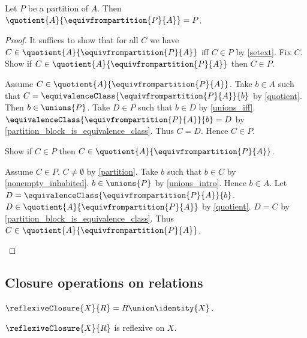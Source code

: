 \begin{proposition}\label{partition_eq_quotient_by_equivalence_from_partition}
    Let $P$ be a partition of $A$.
    Then $\quotient{A}{\equivfrompartition{P}{A}} = P$.
\end{proposition}
\begin{proof}
    It suffices to show that for all $C$ we have
        $C\in\quotient{A}{\equivfrompartition{P}{A}}$ iff $C\in P$
        by \cref{setext}.
    Fix $C$.
    Show if $C\in\quotient{A}{\equivfrompartition{P}{A}}$ then $C\in P$.
    \begin{subproof}
        Assume $C\in\quotient{A}{\equivfrompartition{P}{A}}$.
        Take $b\in A$ such that
            $C=\equivalenceClass{\equivfrompartition{P}{A}}{b}$
            by \cref{quotient}.
        Then $b\in\unions{P}$.
        Take $D\in P$ such that $b\in D$ by \cref{unions_iff}.
        $\equivalenceClass{\equivfrompartition{P}{A}}{b}=D$
            by \cref{partition_block_is_equivalence_class}.
        Thus $C=D$.
        Hence $C\in P$.
    \end{subproof}
    Show if $C\in P$ then
        $C\in\quotient{A}{\equivfrompartition{P}{A}}$.
    \begin{subproof}
        Assume $C\in P$.
        $C\neq\emptyset$ by \cref{partition}.
        Take $b$ such that $b\in C$ by \cref{nonempty_inhabited}.
        $b\in\unions{P}$ by \cref{unions_intro}.
        Hence $b\in A$.
        Let $D=\equivalenceClass{\equivfrompartition{P}{A}}{b}$.
        $D\in\quotient{A}{\equivfrompartition{P}{A}}$ by \cref{quotient}.
        $D=C$ by \cref{partition_block_is_equivalence_class}.
        Thus $C\in\quotient{A}{\equivfrompartition{P}{A}}$.
    \end{subproof}
\end{proof}

\subsection{Closure operations on relations}

\begin{definition}\label{reflexive_closure}
    $\reflexiveClosure{X}{R} = R\union\identity{X}$.
\end{definition}

\begin{proposition}\label{reflexive_closure_is_reflexive}
    $\reflexiveClosure{X}{R}$ is reflexive on $X$.
\end{proposition}

